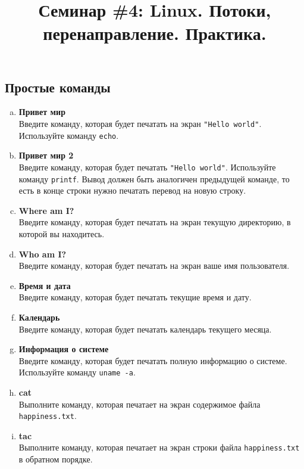 \documentclass{article}
\begin{document}
\title{Семинар \#4: Linux. Потоки, перенаправление. Практика. \vspace{-5ex}}\date{}\maketitle


\subsection{Простые команды}
\begin{enumerate}[a.]
\item \textbf{Привет мир}\\
Введите команду, которая будет печатать на экран \texttt{"Hello world"}. Используйте команду \texttt{echo}.

\item \textbf{Привет мир 2}\\
Введите команду, которая будет печатать \texttt{"Hello world"}. Используйте команду \texttt{printf}. Вывод должен быть аналогичен предыдущей команде, то есть в конце строки нужно печатать перевод на новую строку.

\item \textbf{Where am I?}\\
Введите команду, которая будет печатать на экран текущую директорию, в которой вы находитесь.

\item \textbf{Who am I?}\\
Введите команду, которая будет печатать на экран ваше имя пользователя.

\item \textbf{Время и дата}\\
Введите команду, которая будет печатать текущие время и дату.

\item \textbf{Календарь}\\
Введите команду, которая будет печатать календарь текущего месяца.

\item \textbf{Информация о системе}\\
Введите команду, которая будет печатать полную информацию о системе. Используйте команду \texttt{uname -a}.

\item \textbf{cat}\\
Выполните команду, которая печатает на экран содержимое файла \texttt{happiness.txt}.

\item \textbf{tac}\\
Выполните команду, которая печатает на экран строки файла \texttt{happiness.txt} в обратном порядке.


\end{enumerate}
\end{document}
